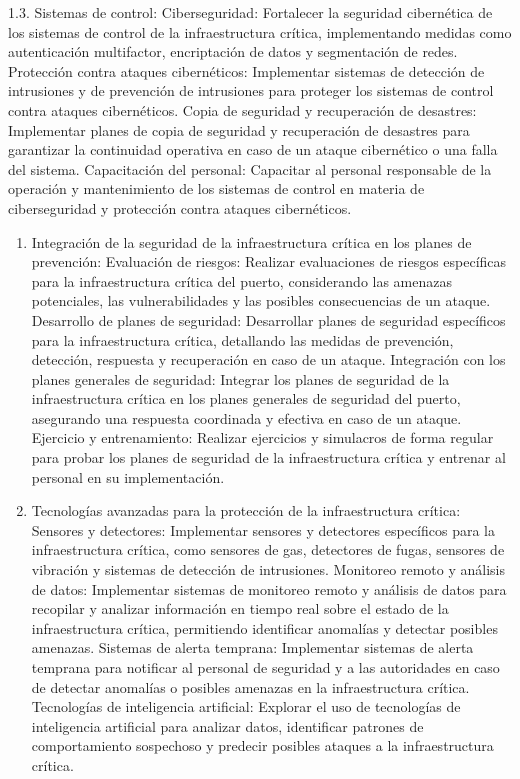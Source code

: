 \documentclass{article}
\begin{document}
1.3. Sistemas de control: Ciberseguridad: Fortalecer la seguridad
cibernética de los sistemas de control de la infraestructura crítica,
implementando medidas como autenticación multifactor, encriptación de
datos y segmentación de redes. Protección contra ataques cibernéticos:
Implementar sistemas de detección de intrusiones y de prevención de
intrusiones para proteger los sistemas de control contra ataques
cibernéticos. Copia de seguridad y recuperación de desastres:
Implementar planes de copia de seguridad y recuperación de desastres
para garantizar la continuidad operativa en caso de un ataque
cibernético o una falla del sistema. Capacitación del personal:
Capacitar al personal responsable de la operación y mantenimiento de los
sistemas de control en materia de ciberseguridad y protección contra
ataques cibernéticos.

\begin{enumerate}
\def\labelenumi{\arabic{enumi}.}
\setcounter{enumi}{1}
\item
  Integración de la seguridad de la infraestructura crítica en los
  planes de prevención: Evaluación de riesgos: Realizar evaluaciones de
  riesgos específicas para la infraestructura crítica del puerto,
  considerando las amenazas potenciales, las vulnerabilidades y las
  posibles consecuencias de un ataque. Desarrollo de planes de
  seguridad: Desarrollar planes de seguridad específicos para la
  infraestructura crítica, detallando las medidas de prevención,
  detección, respuesta y recuperación en caso de un ataque. Integración
  con los planes generales de seguridad: Integrar los planes de
  seguridad de la infraestructura crítica en los planes generales de
  seguridad del puerto, asegurando una respuesta coordinada y efectiva
  en caso de un ataque. Ejercicio y entrenamiento: Realizar ejercicios y
  simulacros de forma regular para probar los planes de seguridad de la
  infraestructura crítica y entrenar al personal en su implementación.
\item
  Tecnologías avanzadas para la protección de la infraestructura
  crítica: Sensores y detectores: Implementar sensores y detectores
  específicos para la infraestructura crítica, como sensores de gas,
  detectores de fugas, sensores de vibración y sistemas de detección de
  intrusiones. Monitoreo remoto y análisis de datos: Implementar
  sistemas de monitoreo remoto y análisis de datos para recopilar y
  analizar información en tiempo real sobre el estado de la
  infraestructura crítica, permitiendo identificar anomalías y detectar
  posibles amenazas. Sistemas de alerta temprana: Implementar sistemas
  de alerta temprana para notificar al personal de seguridad y a las
  autoridades en caso de detectar anomalías o posibles amenazas en la
  infraestructura crítica. Tecnologías de inteligencia artificial:
  Explorar el uso de tecnologías de inteligencia artificial para
  analizar datos, identificar patrones de comportamiento sospechoso y
  predecir posibles ataques a la infraestructura crítica.
\end{enumerate}
\end{document}
